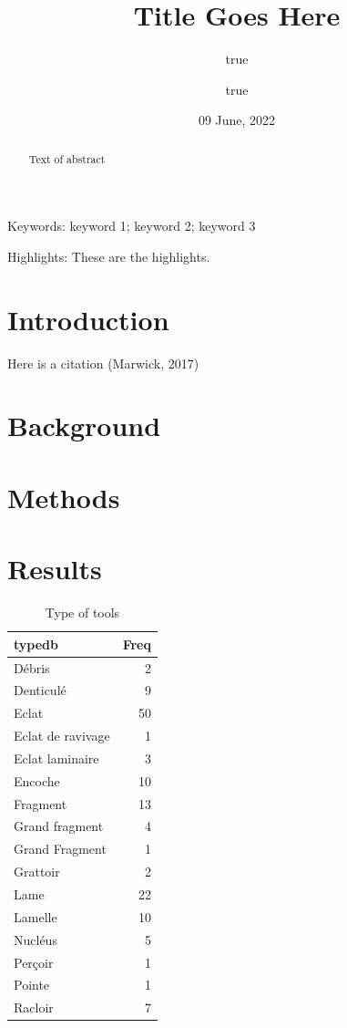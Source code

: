 \documentclass[
]{article}
\title{Title Goes Here}
\author{true \and true}
\date{09 June, 2022}
\begin{document}
\maketitle
\begin{abstract}
Text of abstract
\end{abstract}

{
\setcounter{tocdepth}{2}
\tableofcontents
}
Keywords: keyword 1; keyword 2; keyword 3

Highlights: These are the highlights.

\hypertarget{introduction}{%
\section{Introduction}\label{introduction}}

Here is a citation (Marwick, 2017)

\hypertarget{background}{%
\section{Background}\label{background}}

\hypertarget{methods}{%
\section{Methods}\label{methods}}

\hypertarget{results}{%
\section{Results}\label{results}}

\begin{table}

\caption{\label{tab:type}Type of tools}
\centering
\begin{tabular}[t]{l|r}
\hline
typedb & Freq\\
\hline
Débris & 2\\
\hline
Denticulé & 9\\
\hline
Eclat & 50\\
\hline
Eclat  de ravivage & 1\\
\hline
Eclat laminaire & 3\\
\hline
Encoche & 10\\
\hline
Fragment & 13\\
\hline
Grand fragment & 4\\
\hline
Grand Fragment & 1\\
\hline
Grattoir & 2\\
\hline
Lame & 22\\
\hline
Lamelle & 10\\
\hline
Nucléus & 5\\
\hline
Perçoir & 1\\
\hline
Pointe & 1\\
\hline
Racloir & 7\\
\hline
\end{tabular}
\end{table}
\end{document}
